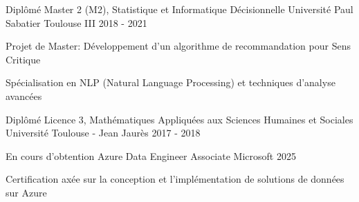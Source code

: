 


\begin{cventries}


\cventry
{Diplômé} %
{Master 2 (M2), Statistique et Informatique Décisionnelle} %
{Université Paul Sabatier Toulouse III} %
{2018 - 2021} %
{ %
\begin{cvitems}
\item {Projet de Master: Développement d'un algorithme de recommandation pour Sens Critique}
\item {Spécialisation en NLP (Natural Language Processing) et techniques d'analyse avancées}
\end{cvitems}
}
\vspace{1.5em}


\cventry
{Diplômé} %
{Licence 3, Mathématiques Appliquées aux Sciences Humaines et Sociales} %
{Université Toulouse - Jean Jaurès} %
{2017 - 2018} %
{ %
\begin{cvitems}
\end{cvitems}
}


\end{cventries}




\begin{cventries}

\cventry
{En cours d'obtention} %
{Azure Data Engineer Associate} %
{Microsoft} %
{2025} %
{ %
\begin{cvitems}
\item {Certification axée sur la conception et l'implémentation de solutions de données sur Azure}
\end{cvitems}
}

\end{cventries}
